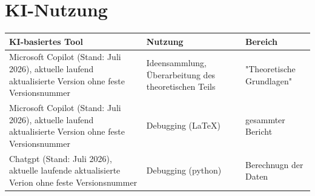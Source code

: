 \chapter{KI-Nutzung}


\begin{table}[H]
\centering
\begin{tabular}{|p{5cm}|p{3cm}|p{3cm}|}
\hline
\textbf{KI-basiertes Tool} & \textbf{Nutzung} & \textbf{Bereich} \\
\hline
Microsoft Copilot (Stand: Juli 2026), aktuelle laufend aktualisierte Version ohne feste Versionsnummer 
& Ideensammlung, Überarbeitung des theoretischen Teils 
& "Theoretische Grundlagen" \\
\hline
Microsoft Copilot (Stand: Juli 2026), aktuelle laufend aktualisierte Version ohne feste Versionsnummer 
& Debugging (LaTeX) & gesammter Bericht \\
\hline
Chatgpt (Stand: Juli 2026),
aktuelle laufende aktualisierte Verion ohne feste Versionsnummer&Debugging (python) & Berechnugn der Daten\\
\hline
\end{tabular}
\end{table}

